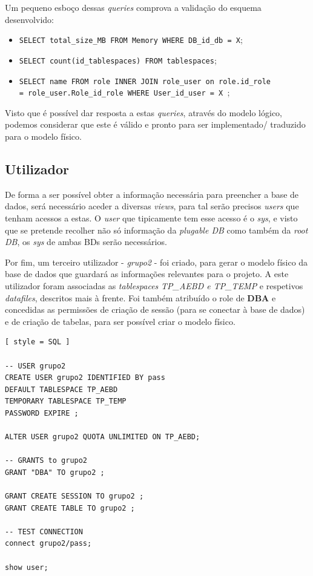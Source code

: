 \documentclass[a4paper]{article}
\begin{document}
\hspace{2mm} 

Um pequeno esboço dessas \emph{queries} comprova a validação do esquema desenvolvido:


\begin{itemize}
    \item \texttt{SELECT total\_size\_MB FROM Memory WHERE DB\_id\_db = X};
    \item \texttt{SELECT count(id\_tablespaces) FROM tablespaces};
    \item \texttt{SELECT name FROM role INNER JOIN role\_user on role.id\_role \\= role\_user.Role\_id\_role WHERE User\_id\_user = X };
\end{itemize}

Visto que é possível dar resposta a estas \emph{queries}, através do modelo lógico, podemos considerar que este é válido e pronto para ser implementado/ traduzido para o modelo físico. 

\subsection{Utilizador}
\label{users}
\hspace{3mm} 
De forma a ser possível obter a informação necessária para preencher a base de dados, será necessário aceder a diversas \emph{views}, para tal serão precisos \emph{users} que tenham acessos a estas. O \emph{user} que tipicamente tem esse acesso é o \emph{sys}, e visto que se pretende recolher não só informação da \emph{plugable DB} como também da \emph{root DB}, os \emph{sys} de ambas BDs serão necessários.

Por fim, um terceiro utilizador - \emph{grupo2} - foi criado, para gerar o modelo físico da base de dados que guardará as informações relevantes para o projeto.
A este utilizador foram associadas as \emph{tablespaces} \emph{TP\_AEBD e TP\_TEMP} e respetivos \emph{datafiles}, descritos mais à frente. Foi também atribuído o role de \textbf{DBA} e concedidas as permissões de criação de sessão (para se conectar à base de dados) e de criação de tabelas, para ser possível criar o modelo físico.


\begin{lstlisting}[ style = SQL ]
                    
-- USER grupo2
CREATE USER grupo2 IDENTIFIED BY pass  
DEFAULT TABLESPACE TP_AEBD
TEMPORARY TABLESPACE TP_TEMP
PASSWORD EXPIRE ;

ALTER USER grupo2 QUOTA UNLIMITED ON TP_AEBD;

-- GRANTS to grupo2
GRANT "DBA" TO grupo2 ;

GRANT CREATE SESSION TO grupo2 ;
GRANT CREATE TABLE TO grupo2 ;

-- TEST CONNECTION
connect grupo2/pass;

show user;  
                    
\end{lstlisting}
\end{document}
